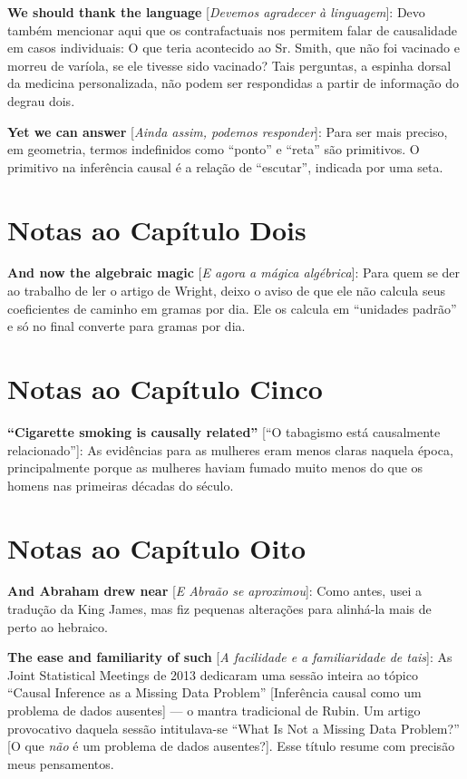 \documentclass[11pt,a5paper,twoside]{book}
\begin{document}
\textbf{We should thank the language} [\textit{Devemos agradecer à linguagem}]: Devo também mencionar aqui que os contrafactuais nos permitem falar de causalidade em casos individuais: O que teria acontecido ao Sr. Smith, que não foi vacinado e morreu de varíola, se ele tivesse sido vacinado? Tais perguntas, a espinha dorsal da medicina personalizada, não podem ser respondidas a partir de informação do degrau dois.

\textbf{Yet we can answer} [\textit{Ainda assim, podemos responder}]: Para ser mais preciso, em geometria, termos indefinidos como “ponto” e “reta” são primitivos. O primitivo na inferência causal é a relação de “escutar”, indicada por uma seta.

\section{Notas ao Capítulo Dois}
\textbf{And now the algebraic magic} [\textit{E agora a mágica algébrica}]: Para quem se der ao trabalho de ler o artigo de Wright, deixo o aviso de que ele não calcula seus coeficientes de caminho em gramas por dia. Ele os calcula em “unidades padrão” e só no final converte para gramas por dia.

\section{Notas ao Capítulo Cinco}
\textbf{“Cigarette smoking is causally related”} [“O tabagismo está causalmente relacionado”]: As evidências para as mulheres eram menos claras naquela época, principalmente porque as mulheres haviam fumado muito menos do que os homens nas primeiras décadas do século.

\section{Notas ao Capítulo Oito}
\textbf{And Abraham drew near} [\textit{E Abraão se aproximou}]: Como antes, usei a tradução da King James, mas fiz pequenas alterações para alinhá-la mais de perto ao hebraico.

\textbf{The ease and familiarity of such} [\textit{A facilidade e a familiaridade de tais}]: As Joint Statistical Meetings de 2013 dedicaram uma sessão inteira ao tópico “Causal Inference as a Missing Data Problem” [Inferência causal como um problema de dados ausentes] — o mantra tradicional de Rubin. Um artigo provocativo daquela sessão intitulava-se “What Is Not a Missing Data Problem?” [O que \textit{não} é um problema de dados ausentes?]. Esse título resume com precisão meus pensamentos.
\end{document}
